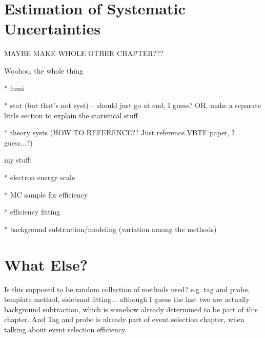 \section{Estimation of Systematic Uncertainties}
\label{anMeth:Systs}
MAYBE MAKE WHOLE OTHER CHAPTER???

Woohoo, the whole thing

   * lumi

   * stat (but that's not syst) -- should just go at end, I guess?  
OR, make a separate little section to explain the statistical stuff

   * theory systs (HOW TO REFERENCE??  Just reference VBTF paper, I guess...?)

my stuff: 

   * electron energy scale
  
   * MC sample for efficiency

   * efficiency fitting

   * background subtraction/modeling (variation among the methods)

\section{What Else?}
\label{anMeth:WhatElse}
Is this supposed to be random collection of methods used?  
e.g. tag and probe, template method, sideband fitting... 
although I guess the last two are actually background subtraction, 
which is somehow already determined to be part of this chapter.  
And Tag and probe is already part of event selection chapter, 
when talking about event selection efficiency.  